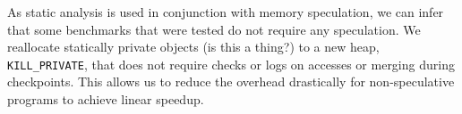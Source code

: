 As static analysis is used in conjunction with memory speculation, we can
infer that some benchmarks that were tested do not require any speculation.
We reallocate statically private objects (is this a thing?) to a new heap,
\texttt{KILL\_PRIVATE}, that does not require checks or logs on accesses or
merging during checkpoints. This allows us to reduce the overhead
drastically for non-speculative programs to achieve linear speedup.




%
